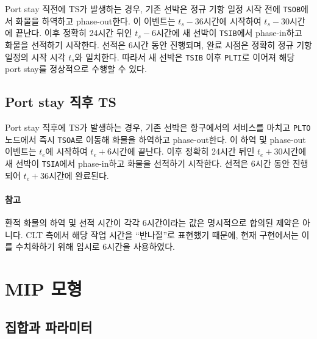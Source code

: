 \documentclass[11pt]{article}
\begin{document}
Port stay 직전에 TS가 발생하는 경우, 기존 선박은 정규 기항 일정 시작 전에
\texttt{TSOB}에서 화물을 하역하고 phase-out한다. 이 이벤트는 $t_s-36$시간에
시작하여 $t_s-30$시간에 끝난다. 이후 정확히 24시간 뒤인 $t_s-6$시간에 새 선박이
\texttt{TSIB}에서 phase-in하고 화물을 선적하기 시작한다. 선적은 6시간 동안
진행되며, 완료 시점은 정확히 정규 기항 일정의 시작 시각 $t_s$와 일치한다.
따라서 새 선박은 \texttt{TSIB} 이후 \texttt{PLTI}로 이어져 해당 port stay를
정상적으로 수행할 수 있다.

\subsection{Port stay 직후 TS}

Port stay 직후에 TS가 발생하는 경우, 기존 선박은 항구에서의 서비스를 마치고
\texttt{PLTO} 노드에서 즉시 \texttt{TSOA}로 이동해 화물을 하역하고 phase-out한다.
이 하역 및 phase-out 이벤트는 $t_e$에 시작하여 $t_e+6$시간에 끝난다. 이후 정확히
24시간 뒤인 $t_e+30$시간에 새 선박이 \texttt{TSIA}에서 phase-in하고 화물을
선적하기 시작한다. 선적은 6시간 동안 진행되어 $t_e+36$시간에 완료된다.
\paragraph{참고}
환적 화물의 하역 및 선적 시간이 각각 6시간이라는 값은 명시적으로 합의된 제약은
아니다. CLT 측에서 해당 작업 시간을 ``반나절''로 표현했기 때문에, 현재
구현에서는 이를 수치화하기 위해 임시로 6시간을 사용하였다.

\section{MIP 모형}

\subsection{집합과 파라미터}
\end{document}

